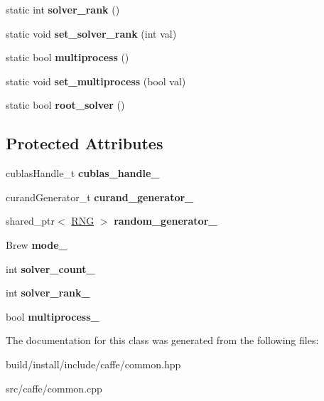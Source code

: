 \begin{DoxyCompactItemize}
static int {\bfseries solver\+\_\+rank} ()
\item 
\mbox{\label{classcaffe_1_1_caffe_a2ec5a171e837fc106e7d1987e3c9a45d}} 
static void {\bfseries set\+\_\+solver\+\_\+rank} (int val)
\item 
\mbox{\label{classcaffe_1_1_caffe_a181e979bf7f7f2fe4a6c5fbbc4d703ac}} 
static bool {\bfseries multiprocess} ()
\item 
\mbox{\label{classcaffe_1_1_caffe_aea8888baaabfc41014eba175a2538b7b}} 
static void {\bfseries set\+\_\+multiprocess} (bool val)
\item 
\mbox{\label{classcaffe_1_1_caffe_a87775a1589a6e1b6e53d9bdbb013b8d8}} 
static bool {\bfseries root\+\_\+solver} ()
\end{DoxyCompactItemize}
\subsection*{Protected Attributes}
\begin{DoxyCompactItemize}
\item 
\mbox{\label{classcaffe_1_1_caffe_a5fb5298203759722a061644b508ddaeb}} 
cublas\+Handle\+\_\+t {\bfseries cublas\+\_\+handle\+\_\+}
\item 
\mbox{\label{classcaffe_1_1_caffe_a0d920ccea7282d5d88335847c0e9ca9e}} 
curand\+Generator\+\_\+t {\bfseries curand\+\_\+generator\+\_\+}
\item 
\mbox{\label{classcaffe_1_1_caffe_aac795e2853c8ac826b3571bba9642474}} 
shared\+\_\+ptr$<$ \mbox{\hyperlink{classcaffe_1_1_caffe_1_1_r_n_g}{R\+NG}} $>$ {\bfseries random\+\_\+generator\+\_\+}
\item 
\mbox{\label{classcaffe_1_1_caffe_aef998c6b69827060630e21a8ccf8884e}} 
Brew {\bfseries mode\+\_\+}
\item 
\mbox{\label{classcaffe_1_1_caffe_afc26b38d30812df267645c4a94135a74}} 
int {\bfseries solver\+\_\+count\+\_\+}
\item 
\mbox{\label{classcaffe_1_1_caffe_a00152204105cd59b691d8bda828664b5}} 
int {\bfseries solver\+\_\+rank\+\_\+}
\item 
\mbox{\label{classcaffe_1_1_caffe_a25bdfb72baf0bfc5fca31579b08d2b6f}} 
bool {\bfseries multiprocess\+\_\+}
\end{DoxyCompactItemize}


The documentation for this class was generated from the following files\+:\begin{DoxyCompactItemize}
\item 
build/install/include/caffe/common.\+hpp\item 
src/caffe/common.\+cpp\end{DoxyCompactItemize}
